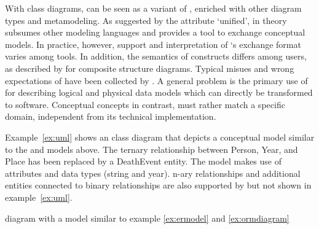 With class diagrams,  can be seen as a variant of ,
enriched with other diagram types and metamodeling. As suggested by the
attribute `unified',  in theory subsumes other modeling languages and
provides a tool to exchange conceptual models. In practice, however, support
and interpretation of `s exchange format  varies among tools. In addition, the semantics of 
constructs differs among users, as described by \textcite{Oliver2006} for
composite structure diagrams. Typical misues and wrong expectations of
 have been collected by \textcite{Bell2004}. A general problem is the
primary use of  for describing logical and physical data models which
can directly be transformed to software. Conceptual concepts in contrast, must
rather match a specific domain, independent from its technical implementation.

Example~\ref{ex:uml} shows an  class diagram that depicts a
conceptual model similar to the  and  models above. The
ternary relationship between {\ormtext Person}, {\ormtext Year}, and {\ormtext
Place} has been replaced by a {\ormtext DeathEvent} entity. The model makes use
of attributes and data types ({\ormtext string} and {\ormtext year}). n-ary
relationships and additional entities connected to binary relationships are
also supported by  but not shown in example~\ref{ex:uml}.

\begin{example}
\centering
{}
\caption{ diagram with a model similar to example
\ref{ex:ermodel} and \ref{ex:ormdiagram}}
\label{ex:uml}
\end{example}


